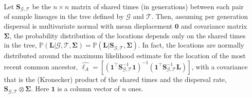 \documentclass[12pt]{article}
\begin{document}
Let $\mathbf{S}_{\mathcal{G},\mathcal{T}}$ be the $n\times n$ matrix of shared  times (in generations) between each pair of sample lineages in the tree defined by $\mathcal{G}$ and $\mathcal{T}$. Then, assuming per generation dispersal is multivariate normal with mean displacement $\mathbf{0}$ and covariance matrix $\mathbf{\Sigma}$, the probability distribution of the locations depends only on the shared times in the tree, $\mathbb{P}(\mathbf{L} | \mathcal{G},\mathcal{T}, \mathbf{\Sigma}) = \mathbb{P}(\mathbf{L} | \mathbf{S}_{\mathcal{G},\mathcal{T}}, \mathbf{\Sigma})$.
%
In fact, the locations are normally distributed
%
%
around the maximum likelihood estimate for the location of the most recent common ancestor,
% 
$\widehat{\bm{\ell}_A} = [(\mathbf{1}^\intercal \mathbf{S}_{\mathcal{G},\mathcal{T}}^{-1} \mathbf{1})^{-1}(\mathbf{1}^\intercal \mathbf{S}_{\mathcal{G},\mathcal{T}}^{-1} \mathbf{L})]$,
%
with a covariance that is the (Kronecker) product of the shared times and the dispersal rate, $\mathbf{S}_{\mathcal{G},\mathcal{T}} \otimes \mathbf{\Sigma}$.
Here $\mathbf{1}$ is a column vector of $n$ ones. %
\end{document}
